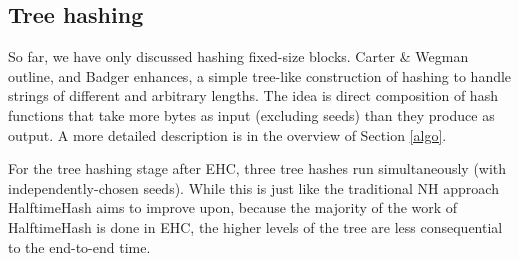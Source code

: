 \documentclass[sigconf, nonacm]{acmart}
\begin{document}

\subsection{Tree hashing}

So far, we have only discussed hashing fixed-size blocks.
Carter \& Wegman outline, and Badger enhances, a simple tree-like construction of hashing to handle strings of different and arbitrary lengths. \cite{badger,carter-wegman-79}
The idea is direct composition of hash functions that take more bytes as input (excluding seeds) than they produce as output.
A more detailed description is in the overview of Section \ref{algo}.

For the tree hashing stage after EHC, three tree hashes run simultaneously (with independently-chosen seeds).
While this is just like the traditional NH approach HalftimeHash aims to improve upon, because the majority of the work of HalftimeHash is done in EHC, the higher levels of the tree are less consequential to the end-to-end time.







\end{document}
